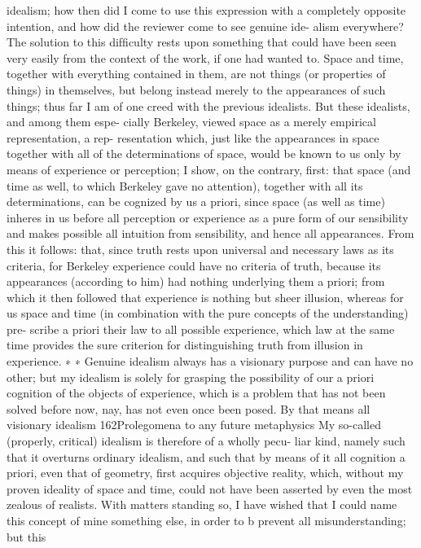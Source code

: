 idealism; how then did I come to use this expression with a completely
opposite intention, and how did the reviewer come to see genuine ide-
alism everywhere?
The solution to this difﬁculty rests upon something that could have
been seen very easily from the context of the work, if one had wanted
to. Space and time, together with everything contained in them, are
not things (or properties of things) in themselves, but belong instead
merely to the appearances of such things; thus far I am of one creed
with the previous idealists. But these idealists, and among them espe-
cially Berkeley, viewed space as a merely empirical representation, a rep-
resentation which, just like the appearances in space together with all
of the determinations of space, would be known to us only by means
of experience or perception; I show, on the contrary, ﬁrst: that space
(and time as well, to which Berkeley gave no attention), together with
all its determinations, can be cognized by us a priori, since space (as
well as time) inheres in us before all perception or experience as a pure
form of our sensibility and makes possible all intuition from sensibility,
and hence all appearances. From this it follows: that, since truth rests
upon universal and necessary laws as its criteria, for Berkeley experience
could have no criteria of truth, because its appearances (according to
him) had nothing underlying them a priori; from which it then followed
that experience is nothing but sheer illusion, whereas for us space and
time (in combination with the pure concepts of the understanding) pre-
scribe a priori their law to all possible experience, which law at the same
time provides the sure criterion for distinguishing truth from illusion in
experience. ∗
∗
Genuine idealism always has a visionary purpose and can have no other; but
my idealism is solely for grasping the possibility of our a priori cognition of
the objects of experience, which is a problem that has not been solved before
now, nay, has not even once been posed. By that means all visionary idealism
162Prolegomena to any future metaphysics
My so-called (properly, critical) idealism is therefore of a wholly pecu-
liar kind, namely such that it overturns ordinary idealism, and such that
by means of it all cognition a priori, even that of geometry, ﬁrst acquires
objective reality, which, without my proven ideality of space and time,
could not have been asserted by even the most zealous of realists. With
matters standing so, I have wished that I could name this concept of
mine something else, in order to b prevent all misunderstanding; but this
